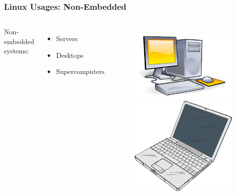\begin{frame}
  \frametitle{Linux Usages: Non-Embedded}
  \begin{columns}
    Non-embedded systems:
      \begin{itemize}
        \item Servers
        \item Desktops
        \item Supercomputers
      \end{itemize}
    \begin{figure}
      \centering
      \includegraphics[scale=0.7]{images/pc.pdf}
      \includegraphics[scale=0.25]{images/laptop.pdf}

\end{figure}
\end{columns}
\end{frame}
